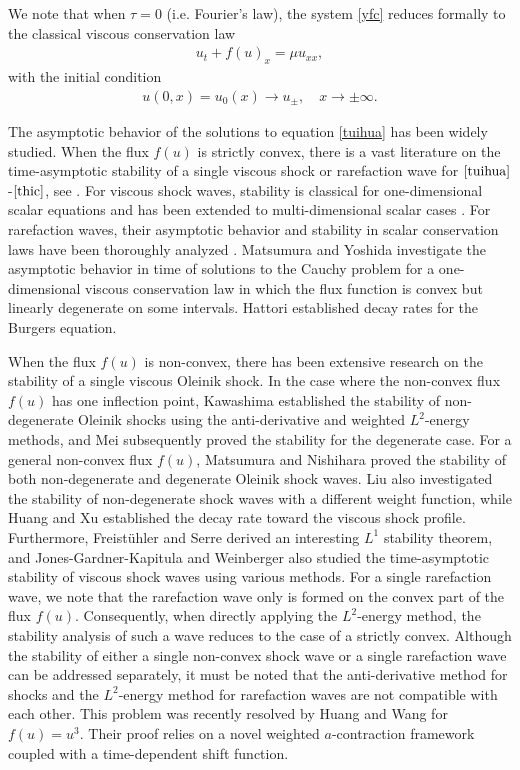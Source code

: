 \documentclass[10pt,reqno]{amsart}
\numberwithin{equation}{section}
\begin{document}
		We note that when $\tau=0$ (i.e. Fourier's law), the system \eqref{yfc} reduces formally to the classical viscous conservation law
		\begin{align}\label{tuihua}
			u_t+f(u)_x=\mu u_{xx},
		\end{align}
		with the initial condition
		\begin{align}\label{thic}
			u(0,x)=u_0(x)\to u_\pm,\quad x\to\pm\infty.
		\end{align}
		
		The asymptotic behavior of the solutions to equation \eqref{tuihua} has been widely studied. When the flux $f(u)$ is strictly convex, there is a vast literature on the time-asymptotic stability of a single viscous shock or rarefaction wave for $\eqref{tuihua}$-$\eqref{thic}$, see \cite{ref1,ref2,ref21,ref27,ref10}. For viscous shock waves, stability is classical for one-dimensional scalar equations \cite{ref1,ref2,ref27} and has been extended to multi-dimensional scalar cases \cite{ref21}. For rarefaction waves, their asymptotic behavior and stability in scalar conservation laws have been thoroughly analyzed \cite{ref10}. Matsumura and Yoshida \cite{ref14} investigate the asymptotic behavior in time of solutions to the Cauchy problem for a one-dimensional viscous conservation law in which the ﬂux function is convex but linearly degenerate on some intervals. Hattori \cite{ref44} established decay rates for the Burgers equation.
		
		When the flux $f(u)$ is non-convex, there has been extensive research on the stability of a single viscous Oleinik shock. In the case where the non-convex flux $f(u)$ has one inflection point, Kawashima \cite{ref34} established the stability of non-degenerate Oleinik shocks using the anti-derivative and weighted $L^2$-energy methods, and Mei \cite{ref19} subsequently proved the stability for the degenerate case. For a general non-convex flux $f(u)$, Matsumura and Nishihara \cite{ref38} proved the stability of both non-degenerate and degenerate Oleinik shock waves. Liu \cite{ref30} also investigated the stability of non-degenerate shock waves with a different weight function, while Huang and Xu \cite{ref18} established the decay rate toward the viscous shock profile. Furthermore, Freist\"uhler and Serre \cite{ref17} derived an interesting $L^1$ stability theorem, and Jones-Gardner-Kapitula \cite{ref12} and Weinberger \cite{ref25} also studied the time-asymptotic stability of viscous shock waves using various methods. For a single rarefaction wave, we note that the rarefaction wave only is formed on the convex part of the flux $f(u)$. Consequently, when directly applying the $L^2$-energy method, the stability analysis of such a wave reduces to the case of a strictly convex. Although the stability of either a single non-convex shock wave or a single rarefaction wave can be addressed separately, it must be noted that the anti-derivative method for shocks and the $L^2$-energy method for rarefaction waves are not compatible with each other. This problem was recently resolved by Huang and Wang \cite{ref16} for $f(u)=u^3$. Their proof relies on a novel weighted $a$-contraction framework coupled with a time-dependent shift function.
		
\end{document}
